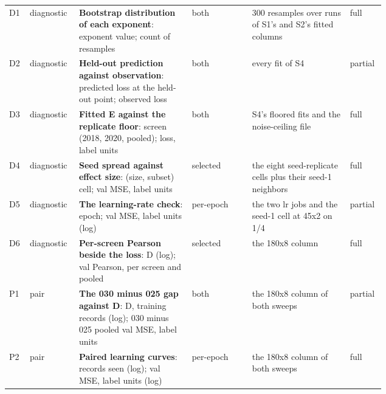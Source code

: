 \begin{table}[htbp]
\begin{tabular}{llp{0.30\linewidth}p{0.16\linewidth}p{0.26\linewidth}l}
D1 & diagnostic & \textbf{Bootstrap distribution of each exponent}: exponent value; count of resamples & both & 300 resamples over runs of S1's and S2's fitted columns & full \\
D2 & diagnostic & \textbf{Held-out prediction against observation}: predicted loss at the held-out point; observed loss & both & every fit of S4 & partial \\
D3 & diagnostic & \textbf{Fitted E against the replicate floor}: screen (2018, 2020, pooled); loss, label units & both & S4's floored fits and the noise-ceiling file & full \\
D4 & diagnostic & \textbf{Seed spread against effect size}: (size, subset) cell; val MSE, label units & selected & the eight seed-replicate cells plus their seed-1 neighbors & full \\
D5 & diagnostic & \textbf{The learning-rate check}: epoch; val MSE, label units (log) & per-epoch & the two lr jobs and the seed-1 cell at 45x2 on 1/4 & partial \\
D6 & diagnostic & \textbf{Per-screen Pearson beside the loss}: D (log); val Pearson, per screen and pooled & selected & the 180x8 column & full \\
P1 & pair & \textbf{The 030 minus 025 gap against D}: D, training records (log); 030 minus 025 pooled val MSE, label units & both & the 180x8 column of both sweeps & partial \\
P2 & pair & \textbf{Paired learning curves}: records seen (log); val MSE, label units (log) & per-epoch & the 180x8 column of both sweeps & full \\
\bottomrule
\end{tabular}
\end{table}
